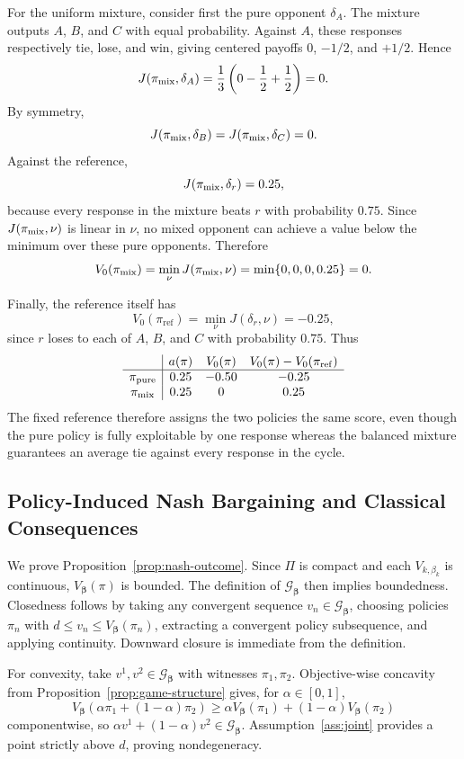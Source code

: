 \documentclass{article}
\theoremstyle{remark}
\theoremstyle{plain}
\newcommand{\G}{\mathcal{G}}
\newcommand{\piref}{\pi_{\mathrm{ref}}}
\begin{document}
For the uniform mixture, consider first the pure opponent $\delta_A$.
The mixture outputs $A$, $B$, and $C$ with equal probability. Against
$A$, these responses respectively tie, lose, and win, giving centered
payoffs $0$, $-1/2$, and $+1/2$. Hence
\[
J(\pi_{\rm mix},\delta_A)
=
\frac13
\left(
0-\frac12+\frac12
\right)
=
0.
\]
By symmetry,
\[
J(\pi_{\rm mix},\delta_B)
=
J(\pi_{\rm mix},\delta_C)
=
0.
\]
Against the reference,
\[
J(\pi_{\rm mix},\delta_r)=0.25,
\]
because every response in the mixture beats $r$ with probability $0.75$.
Since $J(\pi_{\rm mix},\nu)$ is linear in $\nu$, no mixed opponent can
achieve a value below the minimum over these pure opponents. Therefore
\[
V_0(\pi_{\rm mix})
=
\min_{\nu}J(\pi_{\rm mix},\nu)
=
\min\{0,0,0,0.25\}
=
0.
\]

Finally, the reference itself has
\[
V_0(\piref)
=
\min_{\nu}J(\delta_r,\nu)
=
-0.25,
\]
since $r$ loses to each of $A$, $B$, and $C$ with probability $0.75$.
Thus
\[
\begin{array}{c|ccc}
& a(\pi) & V_0(\pi) & V_0(\pi)-V_0(\piref)\\
\hline
\pi_{\rm pure} & 0.25 & -0.50 & -0.25\\
\pi_{\rm mix}  & 0.25 & 0     &  0.25
\end{array}
\]
The fixed reference therefore assigns the two policies the same score,
even though the pure policy is fully exploitable by one response whereas
the balanced mixture guarantees an average tie against every response
in the cycle.

\subsection{Policy-Induced Nash Bargaining and Classical Consequences}
\label{app:nash-properties}
We prove Proposition~\ref{prop:nash-outcome}. Since $\Pi$ is compact and each $V_{k,\beta_k}$ is continuous, $V_{\boldsymbol\beta}(\pi)$ is bounded. The definition of $\G_{\boldsymbol\beta}$ then implies boundedness. Closedness follows by taking any convergent sequence $v_n\in\G_{\boldsymbol\beta}$, choosing policies $\pi_n$ with $d\le v_n\le V_{\boldsymbol\beta}(\pi_n)$, extracting a convergent policy subsequence, and applying continuity. Downward closure is immediate from the definition.

For convexity, take $v^1,v^2\in\G_{\boldsymbol\beta}$ with witnesses $\pi_1,\pi_2$. Objective-wise concavity from Proposition~\ref{prop:game-structure} gives, for $\alpha\in[0,1]$,
\[
V_{\boldsymbol\beta}(\alpha\pi_1+(1-\alpha)\pi_2)
\ge
\alpha V_{\boldsymbol\beta}(\pi_1)+(1-\alpha)V_{\boldsymbol\beta}(\pi_2)
\]
componentwise, so $\alpha v^1+(1-\alpha)v^2\in\G_{\boldsymbol\beta}$. Assumption~\ref{ass:joint} provides a point strictly above $d$, proving nondegeneracy.
\end{document}
